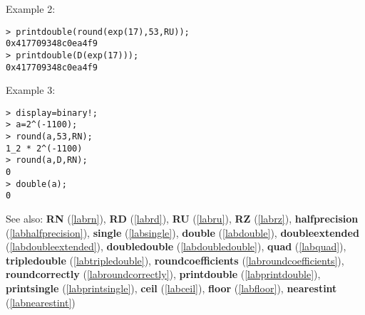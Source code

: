 \noindent Example 2: 
\begin{center}\begin{minipage}{15cm}\begin{Verbatim}[frame=single]
> printdouble(round(exp(17),53,RU));
0x417709348c0ea4f9
> printdouble(D(exp(17)));
0x417709348c0ea4f9
\end{Verbatim}
\end{minipage}\end{center}
\noindent Example 3: 
\begin{center}\begin{minipage}{15cm}\begin{Verbatim}[frame=single]
> display=binary!;
> a=2^(-1100);
> round(a,53,RN);
1_2 * 2^(-1100)
> round(a,D,RN);
0
> double(a);
0
\end{Verbatim}
\end{minipage}\end{center}
See also: \textbf{RN} (\ref{labrn}), \textbf{RD} (\ref{labrd}), \textbf{RU} (\ref{labru}), \textbf{RZ} (\ref{labrz}), \textbf{halfprecision} (\ref{labhalfprecision}), \textbf{single} (\ref{labsingle}), \textbf{double} (\ref{labdouble}), \textbf{doubleextended} (\ref{labdoubleextended}), \textbf{doubledouble} (\ref{labdoubledouble}), \textbf{quad} (\ref{labquad}), \textbf{tripledouble} (\ref{labtripledouble}), \textbf{roundcoefficients} (\ref{labroundcoefficients}), \textbf{roundcorrectly} (\ref{labroundcorrectly}), \textbf{printdouble} (\ref{labprintdouble}), \textbf{printsingle} (\ref{labprintsingle}), \textbf{ceil} (\ref{labceil}), \textbf{floor} (\ref{labfloor}), \textbf{nearestint} (\ref{labnearestint})
